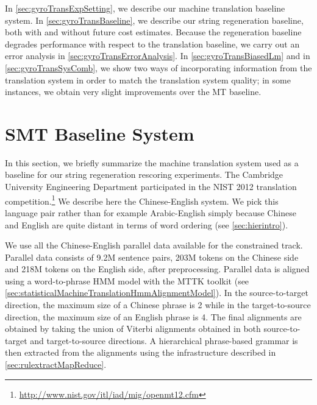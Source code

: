 In \autoref{sec:gyroTransExpSetting}, we describe
our machine translation baseline system.
In \autoref{sec:gyroTransBaseline}, we describe
our string regeneration baseline, both with and without
future cost estimates. Because the regeneration baseline
degrades performance with respect to the translation
baseline, we carry out an error analysis
in \autoref{sec:gyroTransErrorAnalysis}.
In \autoref{sec:gyroTransBiasedLm} and
in \autoref{sec:gyroTransSysComb}, we show two ways of incorporating
information from the translation system in order to match
the translation system quality; in some instances,
we obtain very slight improvements over the MT baseline.

\section{SMT Baseline System}
\label{sec:gyroTransExpSetting}

In this section, we briefly summarize the machine translation
system used as a baseline for our string regeneration rescoring
experiments.
%
%
The Cambridge University Engineering Department participated in the
NIST 2012 translation
competition.\footnote{\url{http://www.nist.gov/itl/iad/mig/openmt12.cfm}}
We describe here the Chinese-English system. We pick this language
pair rather than for example Arabic-English simply because Chinese
and English are quite distant in terms of word ordering (see \autoref{sec:hierintro}).

We use all the Chinese-English parallel data
available for the constrained track. Parallel data consists
of 9.2M sentence pairs, 203M tokens on the Chinese side and
218M tokens on the English side, after preprocessing.
Parallel data is aligned using a word-to-phrase
HMM model with the MTTK
toolkit (see \autoref{sec:statisticalMachineTranslationHmmAlignmentModel}).
In the source-to-target direction, the maximum size of a Chinese phrase is 2 while
in the target-to-source direction, the maximum size of an English phrase is 4. %
The final alignments are obtained by taking
the union of Viterbi alignments obtained
in both source-to-target and target-to-source directions.
A hierarchical phrase-based grammar is then extracted from
the alignments using the infrastructure described
in \autoref{sec:rulextractMapReduce}.

